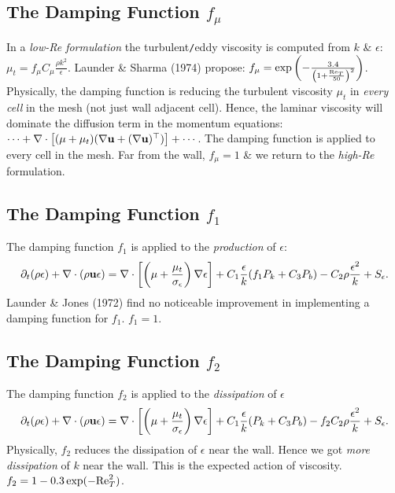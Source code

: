 \documentclass[oneside]{book}
\numberwithin{equation}{section}
\begin{document}
\subsection{The Damping Function $f_\mu$}
In a \textit{low-Re formulation} the turbulent\texttt{/}eddy viscosity is computed from $k$ \& $\epsilon$: $\mu_t = f_\mu C_\mu\frac{\rho k^2}{\epsilon}$. Launder \& Sharma (1974) propose: $f_\mu = \exp\left(-\frac{3.4}{\left(1 + \frac{{\rm Re}_T}{50}\right)^2}\right)$. Physically, the damping function is reducing the turbulent viscosity $\mu_t$ in \textit{every cell} in the mesh (not just wall adjacent cell). Hence, the laminar viscosity will dominate the diffusion term in the momentum equations: $\cdots + \nabla\cdot\left[(\mu + \mu_t)(\nabla{\bf u} + (\nabla{\bf u})^\top)\right] + \cdots$. The damping function is applied to every cell in the mesh. Far from the wall, $f_\mu = 1$ \& we return to the \textit{high-Re} formulation.

\subsection{The Damping Function $f_1$}
The damping function $f_1$ is applied to the \textit{production} of $\epsilon$:
\begin{align*}
	\partial_t(\rho\epsilon) + \nabla\cdot(\rho{\bf u}\epsilon) = \nabla\cdot\left[\left(\mu + \frac{\mu_t}{\sigma_\epsilon}\right)\nabla\epsilon\right] + C_1\frac{\epsilon}{k}(f_1P_k + C_3P_b) - C_2\rho\frac{\epsilon^2}{k} + S_\epsilon.
\end{align*}
Launder \& Jones (1972) find no noticeable improvement in implementing a damping function for $f_1$. $f_1 = 1$.

\subsection{The Damping Function $f_2$}
The damping function $f_2$ is applied to the \textit{dissipation} of $\epsilon$
\begin{align*}
	\partial_t(\rho\epsilon) + \nabla\cdot(\rho{\bf u}\epsilon) = \nabla\cdot\left[\left(\mu + \frac{\mu_t}{\sigma_\epsilon}\right)\nabla\epsilon\right] + C_1\frac{\epsilon}{k}(P_k + C_3P_b) - f_2C_2\rho\frac{\epsilon^2}{k} + S_\epsilon.
\end{align*}
Physically, $f_2$ reduces the dissipation of $\epsilon$ near the wall. Hence we got \textit{more dissipation} of $k$ near the wall. This is the expected action of viscosity. $f_2 = 1 - 0.3\exp(-{\rm Re}_T^2)$.
\end{document}
